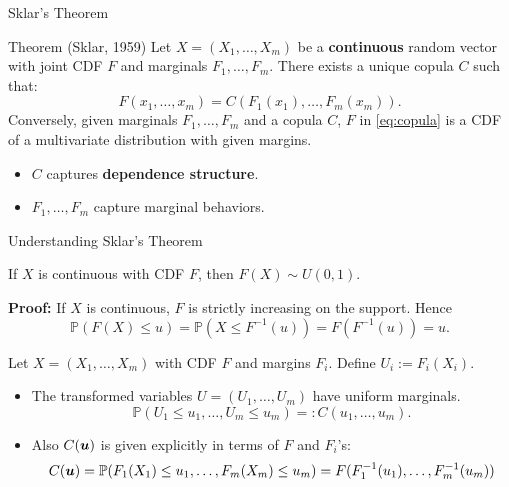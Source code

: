 \documentclass[11pt,handout,aspectratio=169]{beamer}
\begin{document}
\begin{frame}{Sklar's Theorem}
\begin{block}{Theorem (Sklar, 1959)}
Let $X = (X_1, \ldots, X_m)$ be a \textbf{continuous} random vector with joint CDF $F$ and marginals $F_1, \ldots, F_m$. There exists a unique copula $C$ such that:
\begin{equation}\label{eq:copula}
	F(x_1, \dots, x_m) = C(F_1(x_1), \dots, F_m(x_m)). 
\end{equation}
Conversely, given marginals $F_1, \ldots, F_m$ and a copula $C$, $F$ in \eqref{eq:copula} is a CDF of a multivariate distribution with given margins.
\end{block}
\begin{itemize}
    \item $C$ captures \textbf{dependence structure}.
    \item $F_1, \ldots, F_m$ capture marginal behaviors.
\end{itemize}
\end{frame}

\begin{frame}{Understanding Sklar's Theorem}
\begin{alertblock}{}
If $X$ is continuous with CDF $F$, then $F(X) \sim U(0, 1)$. 	
\end{alertblock}
    \textbf{Proof:} If $X$ is continuous, $F$ is strictly increasing on the support. Hence
    \[
    \mathbb{P}(F(X) \leq u) = \mathbb{P}(X \leq F^{-1}(u)) = F(F^{-1}(u)) = u.
    \]
    \vspace{-7mm}
\begin{block}{}
	Let $X = (X_1, \ldots, X_m)$ with CDF $F$ and margins $F_i$. Define $U_i := F_i(X_i)$.
	\begin{itemize}
		\item The transformed variables $U = (U_1, \ldots, U_m)$ have uniform marginals.
    \[ \mathbb{P}(U_1 \leq u_1, \ldots, U_m \leq u_m) =: C(u_1, \ldots, u_m). \]
    \item Also $C(\boldsymbol u)$ is given explicitly in terms of $F$ and $F_i$'s:
    \begin{equation}\label{eq:cop1}
    C(\boldsymbol u)=\mathbb{P}(F_1(X_1) \leq u_1, \ldots, F_m(X_m) \leq u_m) = F(F_1^{-1}(u_1),\ldots,F_m^{-1}(u_m))	
\end{equation}
	\end{itemize}
\end{block}
\end{frame}
\end{document}
